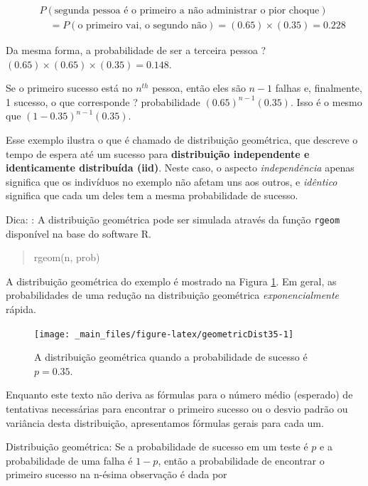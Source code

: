 \documentclass[
]{book}
\theoremstyle{definition}
\theoremstyle{definition}
\theoremstyle{definition}
\theoremstyle{definition}
\theoremstyle{remark}
\begin{document}
\begin{eqnarray*}
&&P(\text{segunda pessoa é o primeiro a não administrar o pior choque}) \\
&&\quad = P(\text{o primeiro vai, o segundo não}) = (0.65)\times(0.35) = 0.228
\end{eqnarray*}

Da mesma forma, a probabilidade de ser a terceira pessoa ? \((0.65)\times(0.65)\times(0.35) = 0.148\).

Se o primeiro sucesso está no \(n^{th}\) pessoa, então eles são \(n-1\) falhas e, finalmente, 1 sucesso, o que corresponde ? probabilidade \((0.65)^{n-1}(0.35)\). Isso é o mesmo que \((1-0.35)^{n-1}(0.35)\).

Esse exemplo ilustra o que é chamado de distribuição geométrica, que descreve o tempo de espera até um sucesso para \textbf{distribuição independente e identicamente distribuída (iid)}. Neste caso, o aspecto \emph{independência} apenas significa que os indivíduos no exemplo não afetam uns aos outros, e \emph{idêntico} significa que cada um deles tem a mesma probabilidade de sucesso.

Dica: : A distribuição geométrica pode ser simulada através da função \texttt{rgeom} disponível na base do software R.

\begin{quote}
rgeom(n, prob)
\end{quote}

A distribuição geométrica do exemplo é mostrado na Figura \ref{fig:geometricDist35}. Em geral, as probabilidades de uma redução na distribuição geométrica \emph{exponencialmente} rápida.

\begin{figure}

{\centering \texttt{[image: \_main\_files/figure-latex/geometricDist35-1]} 

}

\caption{A distribuição geométrica quando a probabilidade de sucesso é $p=0.35$.}\label{fig:geometricDist35}
\end{figure}

Enquanto este texto não deriva as fórmulas para o número médio (esperado) de tentativas necessárias para encontrar o primeiro sucesso ou o desvio padrão ou variância desta distribuição, apresentamos fórmulas gerais para cada um.

Distribuição geométrica: Se a probabilidade de sucesso em um teste é \(p\) e a probabilidade de uma falha é \(1-p\), então a probabilidade de encontrar o primeiro sucesso na n-ésima observação é dada por
\end{document}
